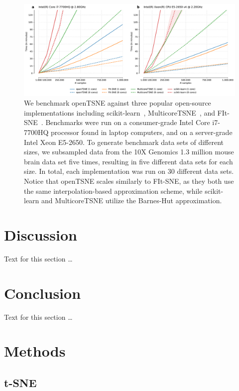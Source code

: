 \documentclass[twocolumn]{bmcart}
\begin{document}
\begin{figure}[htbp]
  \includegraphics[width=\textwidth]{benchmarks}
  \caption{\label{fig:benchmarks}We benchmark openTSNE against three popular open-source implementations including scikit-learn~\cite{pedregosa2011scikit}, MulticoreTSNE~\cite{Ulyanov2016}, and FIt-SNE~\cite{linderman2019fast}. Benchmarks were run on a consumer-grade Intel Core i7-7700HQ processor found in laptop computers, and on a server-grade Intel Xeon E5-2650. To generate benchmark data sets of different sizes, we subsampled data from the 10X Genomics 1.3 million mouse brain data set five times, resulting in five different data sets for each size. In total, each implementation was run on 30 different data sets. Notice that openTSNE scales similarly to FIt-SNE, as they both use the same interpolation-based approximation scheme, while scikit-learn and MulticoreTSNE utilize the Barnes-Hut approximation.}
\end{figure}

\section*{Discussion}
Text for this section \ldots

\section*{Conclusion}
Text for this section \ldots

\section*{Methods}


\subsection*{t-SNE}
\end{document}
